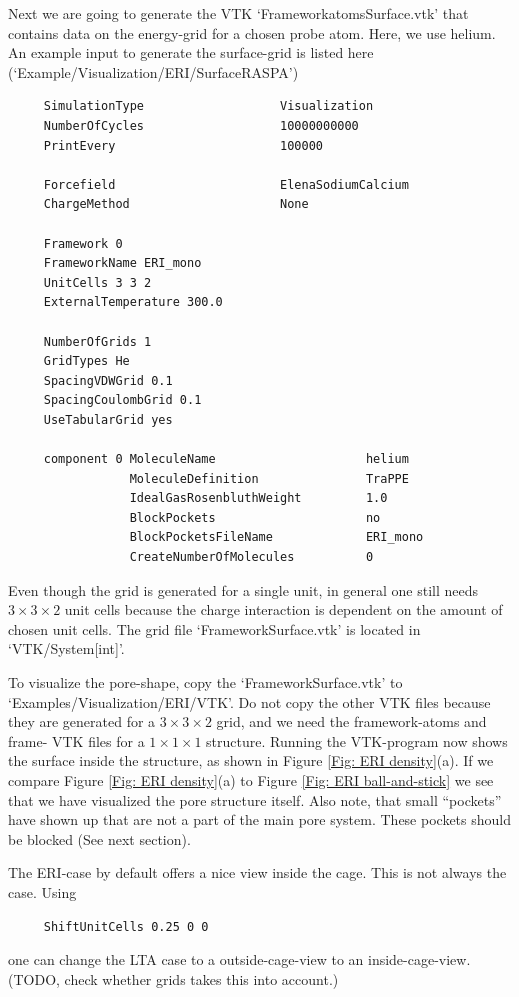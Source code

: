 Next we are going to generate the VTK `FrameworkatomsSurface.vtk' that contains data on the energy-grid for a chosen
probe atom. Here, we use helium.
An example input to generate the surface-grid is listed here (`Example/Visualization/ERI/SurfaceRASPA')
\begin{verbatim}
     SimulationType                   Visualization
     NumberOfCycles                   10000000000
     PrintEvery                       100000

     Forcefield                       ElenaSodiumCalcium
     ChargeMethod                     None

     Framework 0
     FrameworkName ERI_mono
     UnitCells 3 3 2
     ExternalTemperature 300.0

     NumberOfGrids 1
     GridTypes He
     SpacingVDWGrid 0.1
     SpacingCoulombGrid 0.1
     UseTabularGrid yes

     component 0 MoleculeName                     helium
                 MoleculeDefinition               TraPPE
                 IdealGasRosenbluthWeight         1.0
                 BlockPockets                     no
                 BlockPocketsFileName             ERI_mono
                 CreateNumberOfMolecules          0
\end{verbatim}

Even though the grid is generated for a single unit, in general one still needs $3\times3\times2$ unit cells because
the charge interaction is dependent on the amount of chosen unit cells.
The grid file `FrameworkSurface.vtk' is located in `VTK/System[int]'.

To visualize the pore-shape, copy the `FrameworkSurface.vtk' to `Examples/Visualization/ERI/VTK'. Do not copy the other VTK files
because they are generated for a $3\times3\times2$ grid, and we need the framework-atoms and frame- VTK files
for a $1\times1\times1$ structure.
Running the VTK-program now shows the surface inside the structure, as shown in
Figure \ref{Fig: ERI density}(a). If we compare Figure \ref{Fig: ERI density}(a) to Figure \ref{Fig: ERI ball-and-stick}
we see that we have visualized the pore structure itself. Also note, that small ``pockets'' have shown up that are not a
part of the main pore system. These pockets should be blocked (See next section).

The ERI-case by default offers a nice view inside the cage. This is not always the case. Using
\begin{verbatim}
     ShiftUnitCells 0.25 0 0 
\end{verbatim}
one can change the LTA case to a outside-cage-view to an inside-cage-view. (TODO, check whether grids takes this into account.)

